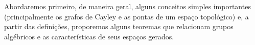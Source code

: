 Abordaremos primeiro, de maneira geral, alguns conceitos simples importantes (principalmente os grafos de Cayley e as pontas de um espaço topológico) e, a partir das definições, proporemos alguns teoremas que relacionam grupos algébricos e as características de seus espaços gerados.
